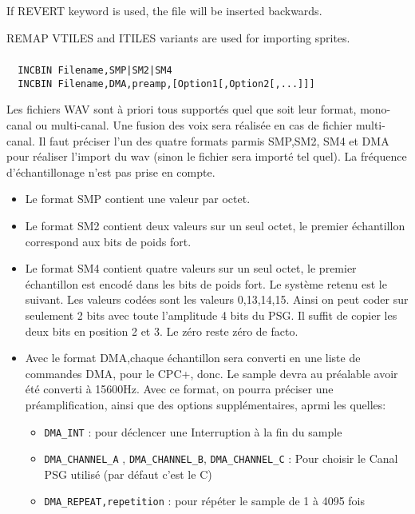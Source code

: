 \begin{xen}
If REVERT keyword is used, the file will be inserted backwards.

REMAP VTILES and ITILES variants are used for importing sprites.
\end{xen}



\subsubsection{}

\begin{verbatim}
  INCBIN Filename,SMP|SM2|SM4
  INCBIN Filename,DMA,preamp,[Option1[,Option2[,...]]]
\end{verbatim}

\begin{xfr}
Les fichiers WAV sont à priori tous supportés quel que soit leur format, mono-canal ou multi-canal. Une fusion des voix sera réalisée en cas de fichier multi-canal. Il faut préciser l'un des quatre formats parmis SMP,SM2, SM4 et DMA pour réaliser l'import du wav (sinon le fichier sera importé tel quel). La fréquence d'échantillonage n'est pas prise en compte.

\begin{itemize}
\item Le format SMP contient une valeur par octet.
\item Le format SM2 contient deux valeurs sur un seul octet, le premier échantillon correspond aux bits de poids fort.
\item Le format SM4 contient quatre valeurs sur un seul octet, le premier échantillon est encodé dans les bits de poids fort. Le système retenu est le suivant. Les valeurs codées sont les valeurs 0,13,14,15. Ainsi on peut coder sur seulement 2 bits avec toute l'amplitude 4 bits du PSG. Il suffit de copier les deux bits en position 2 et 3. Le zéro reste zéro de facto.
\item Avec le format DMA,chaque échantillon sera converti en une liste de commandes DMA, pour le CPC+, donc.
Le sample devra au préalable avoir été converti à 15600Hz. Avec ce format, on pourra préciser une préamplification, ainsi que des options supplémentaires, aprmi les quelles:
  \begin{itemize}
    \item \texttt{DMA\_INT} : pour déclencer  une Interruption à la fin du sample
    \item \texttt{DMA\_CHANNEL\_A} , \texttt{DMA\_CHANNEL\_B}, \texttt{DMA\_CHANNEL\_C} : Pour choisir le Canal PSG utilisé (par défaut c'est le C)
    \item \texttt{DMA\_REPEAT,repetition} : pour répéter le sample de 1 à 4095 fois
  \end{itemize}
\end{itemize}

\end{xfr}

